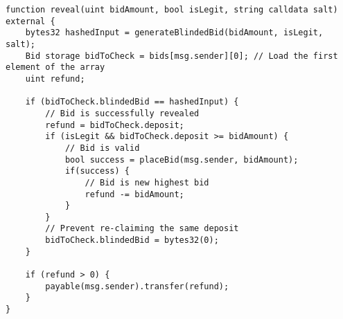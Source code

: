 \begin{lstlisting}[language=Solidity]
function reveal(uint bidAmount, bool isLegit, string calldata salt) external {
    bytes32 hashedInput = generateBlindedBid(bidAmount, isLegit, salt);
    Bid storage bidToCheck = bids[msg.sender][0]; // Load the first element of the array
    uint refund;

    if (bidToCheck.blindedBid == hashedInput) {
        // Bid is successfully revealed
        refund = bidToCheck.deposit;
        if (isLegit && bidToCheck.deposit >= bidAmount) {
            // Bid is valid
            bool success = placeBid(msg.sender, bidAmount);
            if(success) {
                // Bid is new highest bid
                refund -= bidAmount;
            }
        }
        // Prevent re-claiming the same deposit
      	bidToCheck.blindedBid = bytes32(0);
    }

    if (refund > 0) {
        payable(msg.sender).transfer(refund);
    }
}
\end{lstlisting}